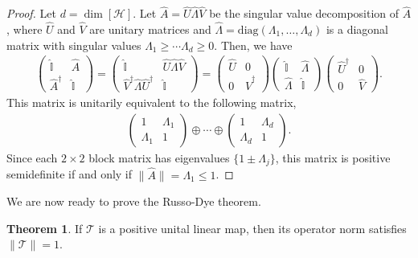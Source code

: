 \documentclass[preprint,pteplogo]{ptephy_v2}%
\numberwithin{equation}{section}
\theoremstyle{definition}
\newtheorem{theorem}{Theorem}
\newcommand{\mc}[1]{\mathcal{#1}}
\newcommand{\mbb}[1]{\mathbb{#1}}
\begin{document}
\begin{proof}
Let $d = \dim [\mc{H}]$. 
Let $\hat{A} = \hat{U} \hat{\Lambda} \hat{V}$ be the singular value decomposition of $\hat{A}$, where $\hat{U}$ and $\hat{V}$ are unitary matrices and $\hat{\Lambda} = \mathrm{diag}(\Lambda_1, \ldots, \Lambda_d)$ is a diagonal matrix with singular values $\Lambda_1 \geq \cdots \Lambda_d \geq 0$.
Then, we have
\begin{align}
\begin{pmatrix} \hat{\mbb{I}} & \hat{A} \\ \hat{A}^\dagger & \hat{\mbb{I}} \end{pmatrix} 
= \begin{pmatrix} \hat{\mbb{I}} & \hat{U} \hat{\Lambda} \hat{V} \\ \hat{V}^\dagger \hat{\Lambda} \hat{U}^\dagger & \hat{\mbb{I}} \end{pmatrix}
= \begin{pmatrix} \hat{U} & 0 \\ 0 & \hat{V}^\dagger \end{pmatrix} \begin{pmatrix} \hat{\mbb{I}} & \hat{\Lambda} \\ \hat{\Lambda} & \hat{\mbb{I}} \end{pmatrix} \begin{pmatrix} \hat{U}^\dagger & 0 \\ 0 & \hat{V} \end{pmatrix}.
\end{align}
This matrix is unitarily equivalent to the following matrix,
\begin{align}
\begin{pmatrix} 1 & \Lambda_1 \\ \Lambda_1 & 1 \end{pmatrix} \oplus \cdots \oplus \begin{pmatrix} 1 & \Lambda_d \\ \Lambda_d & 1 \end{pmatrix}.
\end{align}
Since each $2 \times 2$ block matrix has eigenvalues $\{ 1 \pm \Lambda_j \}$, this matrix is positive semidefinite if and only if $\lVert \hat{A} \rVert = \Lambda_1 \leq 1$.
\end{proof} 

We are now ready to prove the Russo-Dye theorem.
\begin{theorem}
If $\mc{T}$ is a positive unital linear map, then its operator norm satisfies $\lVert \mc{T} \rVert = 1$.
\end{theorem}
\end{document}
